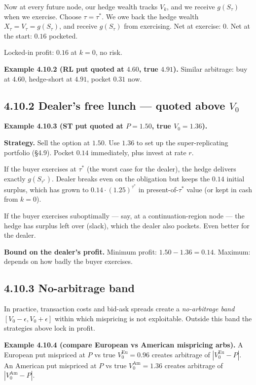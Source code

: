 \documentclass[
  10pt,
  twoside]{book}
\begin{document}
Now at every future node, our hedge wealth tracks \(V_k\), and we
receive \(g(S_\tau)\) when we exercise. Choose \(\tau = \tau^*\). We owe
back the hedge wealth \(X_\tau = V_\tau = g(S_\tau)\), and receive
\(g(S_\tau)\) from exercising. Net at exercise: \(0\). Net at the start:
\(0.16\) pocketed.

Locked-in profit: \(0.16\) at \(k = 0\), no risk.

\textbf{Example 4.10.2 (RL put quoted at \(4.60\), true \(4.91\)).}
Similar arbitrage: buy at \(4.60\), hedge-short at \(4.91\), pocket
\(0.31\) now.

\subsection{\texorpdfstring{4.10.2 Dealer's free lunch --- quoted above
\(V_0\)}{4.10.2 Dealer's free lunch --- quoted above V\_0}}\label{dealers-free-lunch-quoted-above-v_0}

\textbf{Example 4.10.3 (ST put quoted at \(P = 1.50\), true
\(V_0 = 1.36\)).}

\textbf{Strategy.} Sell the option at \(1.50\). Use \(1.36\) to set up
the super-replicating portfolio (§4.9). Pocket \(0.14\) immediately,
plus invest at rate \(r\).

If the buyer exercises at \(\tau^*\) (the worst case for the dealer),
the hedge delivers exactly \(g(S_{\tau^*})\). Dealer breaks even on the
obligation but keeps the \(0.14\) initial surplus, which has grown to
\(0.14\cdot(1.25)^{\tau^*}\) in present-of-\(\tau^*\) value (or kept in
cash from \(k=0\)).

If the buyer exercises suboptimally --- say, at a continuation-region
node --- the hedge has surplus left over (slack), which the dealer also
pockets. Even better for the dealer.

\textbf{Bound on the dealer's profit.} Minimum profit:
\(1.50 - 1.36 = 0.14\). Maximum: depends on how badly the buyer
exercises.

\subsection{4.10.3 No-arbitrage band}\label{no-arbitrage-band}

In practice, transaction costs and bid-ask spreads create a
\emph{no-arbitrage band} \([V_0 - \epsilon, V_0 + \epsilon]\) within
which mispricing is not exploitable. Outside this band the strategies
above lock in profit.

\textbf{Example 4.10.4 (compare European vs American mispricing arbs).}
A European put mispriced at \(P\) vs true \(V_0^{\text{Eu}} = 0.96\)
creates arbitrage of \(|V_0^{\text{Eu}} - P|\). An American put
mispriced at \(P\) vs true \(V_0^{\text{Am}} = 1.36\) creates arbitrage
of \(|V_0^{\text{Am}} - P|\).
\end{document}

